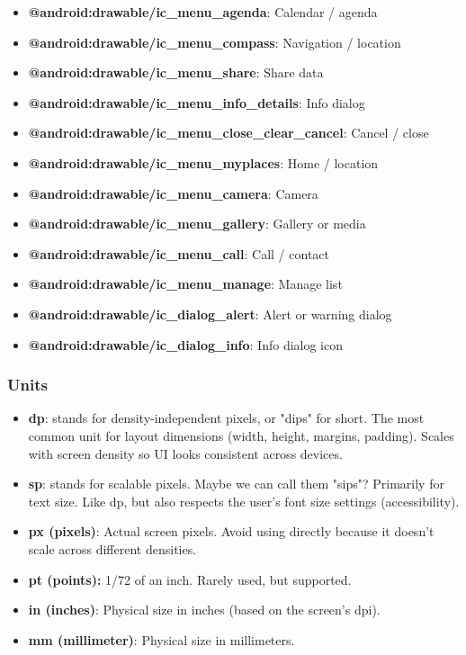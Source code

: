 \documentclass{report}
\begin{document}
\begin{itemize}
\begin{itemize}
                \item \textbf{@android:drawable/ic\_menu\_agenda}:	Calendar / agenda 
                \item \textbf{@android:drawable/ic\_menu\_compass}:	Navigation / location 
                \item \textbf{@android:drawable/ic\_menu\_share}:	Share data 
                \item \textbf{@android:drawable/ic\_menu\_info\_details}:	Info dialog 
                \item \textbf{@android:drawable/ic\_menu\_close\_clear\_cancel}:	Cancel / close 
                \item \textbf{@android:drawable/ic\_menu\_myplaces}:	Home / location 
                \item \textbf{@android:drawable/ic\_menu\_camera}:	Camera 
                \item \textbf{@android:drawable/ic\_menu\_gallery}:	Gallery or media 
                \item \textbf{@android:drawable/ic\_menu\_call}:	Call / contact 
                \item \textbf{@android:drawable/ic\_menu\_manage}:	Manage list 
                \item \textbf{@android:drawable/ic\_dialog\_alert}:	Alert or warning dialog 
                \item \textbf{@android:drawable/ic\_dialog\_info}:	Info dialog icon
            \end{itemize}
    \end{itemize}

    \pagebreak 
    \subsubsection{Units}
    \begin{itemize}
        \item \textbf{dp}: stands for density-independent pixels, or "dips" for short.
            \bigbreak \noindent 
            The most common unit for layout dimensions (width, height, margins, padding). Scales with screen density so UI looks consistent across devices.
        \item \textbf{sp}: stands for scalable pixels. Maybe we can call them "sips"?
            \bigbreak \noindent 
            Primarily for text size. Like dp, but also respects the user's font size settings (accessibility).
        \item \textbf{px (pixels)}: Actual screen pixels. Avoid using directly because it doesn't scale across different densities.
        \item \textbf{pt (points):} 1/72 of an inch. Rarely used, but supported.
        \item \textbf{in (inches)}: Physical size in inches (based on the screen's dpi).
        \item \textbf{mm (millimeter)}: Physical size in millimeters.
    \end{itemize}
\end{document}
